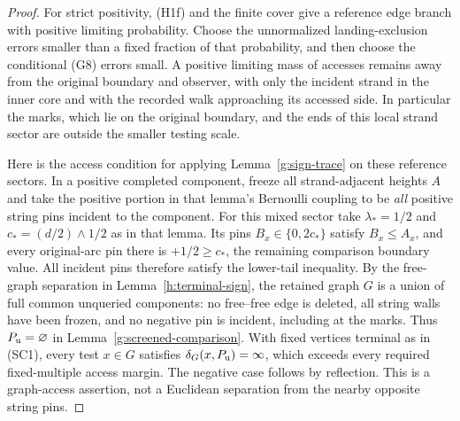 \begin{proof}
For strict positivity, (H1f) and the finite cover give a reference
edge branch with positive limiting probability. Choose the
unnormalized landing-exclusion errors smaller than a fixed fraction
of that probability, and then choose the conditional (G8) errors
small. A positive limiting mass of accesses remains away from the
original boundary and observer, with only the incident strand in the
inner core and with the recorded walk approaching its accessed side.
In particular the marks, which lie on the original boundary, and the
ends of this local strand sector are outside the smaller testing scale.

Here is the access condition for applying Lemma~\ref{g:sign-trace} on
these reference sectors. In a positive completed component, freeze
all strand-adjacent heights $A$ and take the positive portion in that
lemma's Bernoulli coupling to be \emph{all} positive string pins
incident to the component. For this mixed sector take
$\lambda_*=1/2$ and $c_*=(d/2)\wedge1/2$ as in that lemma. Its pins
$B_x\in\{0,2c_*\}$ satisfy $B_x\le A_x$, and every original-arc pin
there is $+1/2\ge c_*$, the remaining comparison boundary value.
All incident pins therefore satisfy the lower-tail inequality.
By the free-graph separation in Lemma~\ref{h:terminal-sign}, the
retained graph $G$ is a union of full common unqueried components:
no free--free edge is deleted, all string walls have been frozen,
and no negative pin is incident, including at the marks. Thus
$P_{\rm u}=\varnothing$ in Lemma~\ref{g:screened-comparison}. With
fixed vertices terminal as in (SC1), every test $x\in G$ satisfies
$\delta_G(x,P_{\rm u})=\infty$, which exceeds every required
fixed-multiple access margin. The negative case follows by reflection.
This is a graph-access assertion, not a Euclidean separation from the
nearby opposite string pins.


\end{proof}
